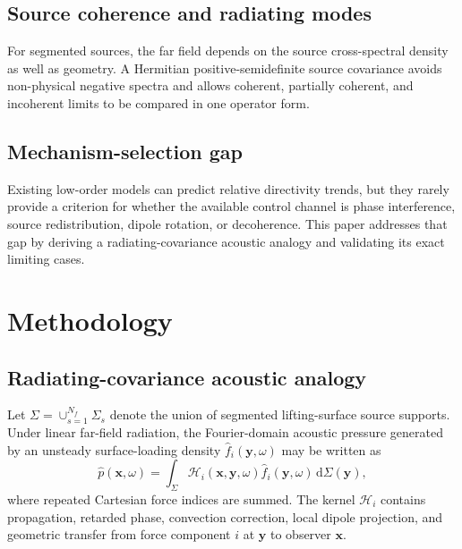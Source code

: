 \documentclass[11pt]{article}
\newcommand{\dd}{\,\mathrm{d}}
\newcommand{\vect}[1]{\bm{#1}}
\begin{document}
\subsection{Source coherence and radiating modes}
For segmented sources, the far field depends on the source cross-spectral density as well as geometry. A Hermitian positive-semidefinite source covariance avoids non-physical negative spectra and allows coherent, partially coherent, and incoherent limits to be compared in one operator form.

\subsection{Mechanism-selection gap}
Existing low-order models can predict relative directivity trends, but they rarely provide a criterion for whether the available control channel is phase interference, source redistribution, dipole rotation, or decoherence. This paper addresses that gap by deriving a radiating-covariance acoustic analogy and validating its exact limiting cases.

\section{Methodology}

\subsection{Radiating-covariance acoustic analogy}

Let $\Sigma=\cup_{s=1}^{N_f}\Sigma_s$ denote the union of segmented lifting-surface source supports. Under linear far-field radiation, the Fourier-domain acoustic pressure generated by an unsteady surface-loading density $\hat f_i(\vect{y},\omega)$ may be written as
\begin{equation}
    \hat p(\vect{x},\omega)
    =
    \int_{\Sigma}
    \mathcal H_i(\vect{x},\vect{y},\omega)
    \hat f_i(\vect{y},\omega)
    \dd\Sigma(\vect{y}),
\label{eq:rcaa_pressure_amplitude}
\end{equation}
where repeated Cartesian force indices are summed. The kernel $\mathcal H_i$ contains propagation, retarded phase, convection correction, local dipole projection, and geometric transfer from force component $i$ at $\vect{y}$ to observer $\vect{x}$.
\end{document}
